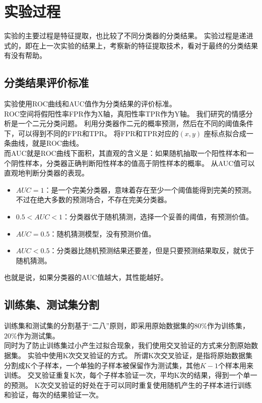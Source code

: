 \section{实验过程}
实验的主要过程是特征提取，也比较了不同分类器的分类结果。
实验过程是递进式的，即在上一次实验的结果上，考察新的特征提取技术，看对于最终的分类结果有没有帮助。\\
\subsection{分类结果评价标准}
实验使用ROC曲线和AUC值作为分类结果的评价标准。\\
ROC空间将假阳性率FPR作为X轴，真阳性率TPR作为Y轴。
我们研究的情感分析是一个二元分类问题。
利用分类器作二元的概率预测，然后在不同的阈值条件下，可以得到不同的FPR和TPR。
将FPR和TPR对应的$ (x, y) $ 座标点拟合成一条曲线，就是ROC曲线。\\
而AUC就是ROC曲线下面积，其直观的含义是：如果随机抽取一个阳性样本和一个阴性样本，分类器正确判断阳性样本的值高于阴性样本的概率。
从AUC值可以直观地判断分类器的表现。
\begin{itemize}
	\item
	  $ AUC = 1 $：是一个完美分类器，意味着存在至少一个阈值能得到完美的预测。不过在绝大多数的预测场合，不存在完美分类器。
	\item
	  $ 0.5 < AUC < 1 $：分类器优于随机猜测，选择一个妥善的阈值，有预测价值。
	\item
	  $ AUC = 0.5 $：随机猜测模型，没有预测价值。
	\item
	  $ AUC < 0.5 $：分类器比随机预测结果还要差，但是只要预测结果取反，就优于随机猜测。
\end{itemize}
也就是说，如果分类器的AUC值越大，其性能越好。

\subsection{训练集、测试集分割}
训练集和测试集的分割基于“二八”原则，即采用原始数据集的$ 80\% $作为训练集，$ 20\% $作为测试集。\\
同时为了防止训练集过小产生过拟合现象，我们使用交叉验证的方式来分割原始数据集。
实验中使用K次交叉验证的方式。
所谓K次交叉验证，是指将原始数据集分割成K个子样本，一个单独的子样本被保留作为测试集，其他$ K-1 $个样本用来训练。
交叉验证重复K次，每个子样本验证一次，平均K次的结果，得到一个单一的预测。
K次交叉验证的好处在于可以同时重复使用随机产生的子样本进行训练和验证，每次的结果验证一次。

